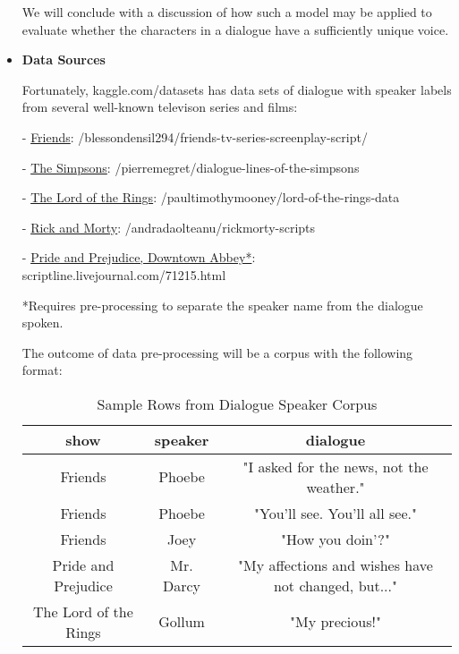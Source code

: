 \documentclass{article}
\begin{document}
\begin{titlepage}
\begin{itemize}
			We will conclude with a discussion of how such a model may be applied to evaluate whether the characters in a dialogue have a sufficiently unique voice. 

            \item[] \textbf{Data Sources}
            
			Fortunately, kaggle.com/datasets has data sets of dialogue with speaker labels from several well-known televison series and films:

			- \href{https://www.kaggle.com/datasets/blessondensil294/friends-tv-series-screenplay-script/data?select=S01E01+Monica+Gets+A+Roommate.txt}{Friends}: /blessondensil294/friends-tv-series-screenplay-script/
			 
			- \href{https://www.kaggle.com/datasets/pierremegret/dialogue-lines-of-the-simpsons}{The Simpsons}: /pierremegret/dialogue-lines-of-the-simpsons
			
			- \href{https://www.kaggle.com/datasets/paultimothymooney/lord-of-the-rings-data?select=lotr_scripts.csv}{The Lord of the Rings}: /paultimothymooney/lord-of-the-rings-data
			
			- \href{https://www.kaggle.com/datasets/andradaolteanu/rickmorty-scripts}{Rick and Morty}: /andradaolteanu/rickmorty-scripts

			- \href{https://scriptline.livejournal.com/71215.html#cutid6}{Pride and Prejudice, Downtown Abbey*}: scriptline.livejournal.com/71215.html
			 
			*Requires pre-processing to separate the speaker name from the dialogue spoken.

			The outcome of data pre-processing will be a corpus with the following format:
			
			\begin{table}[H]
				\centering
				\begin{tabular}{|c|c|c|}
					\hline
					\textbf{} \textbf{show} & \textbf{speaker} & \textbf{dialogue} \\
					\hline
					Friends & Phoebe &  "I asked for the news, not the weather." \\
					Friends & Phoebe &  "You'll see. You'll all see." \\
					Friends & Joey &  "How you doin'?" \\
					Pride and Prejudice & Mr. Darcy &  "My affections and wishes have not changed, but..."  \\
					The Lord of the Rings & Gollum &  "My precious!" \\
					\hline
				\end{tabular}
				\caption{Sample Rows from Dialogue Speaker Corpus}
				\label{tab:images}
			\end{table}


\end{itemize}
\end{titlepage}
\end{document}
